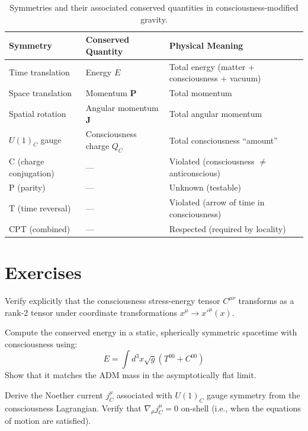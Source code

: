 \begin{table}[h]
\centering
\begin{tabular}{@{} p{} p{} p{} @{}}
\toprule
\textbf{Symmetry} & \textbf{Conserved Quantity} & \textbf{Physical Meaning} \\
\midrule
Time translation & Energy $E$ & Total energy (matter + consciousness + vacuum) \\
Space translation & Momentum $\mathbf{P}$ & Total momentum \\
Spatial rotation & Angular momentum $\mathbf{J}$ & Total angular momentum \\
$U(1)_C$ gauge & Consciousness charge $Q_C$ & Total consciousness ``amount'' \\
\midrule
C (charge conjugation) & --- & Violated (consciousness $\neq$ anticonscious) \\
P (parity) & --- & Unknown (testable) \\
T (time reversal) & --- & Violated (arrow of time in consciousness) \\
CPT (combined) & --- & Respected (required by locality) \\
\bottomrule
\end{tabular}
\caption{Symmetries and their associated conserved quantities in consciousness-modified gravity.}
\label{tab:symmetries-summary}
\end{table}

\section{Exercises}

\begin{exercise}
Verify explicitly that the consciousness stress-energy tensor $C^{\mu\nu}$ transforms as a rank-2 tensor under coordinate transformations $x^\mu \to x'^\mu(x)$.
\end{exercise}

\begin{exercise}
Compute the conserved energy in a static, spherically symmetric spacetime with consciousness using:
\begin{equation}
E = \int d^3x \sqrt{g} \left( T^{00} + C^{00} \right)
\end{equation}
Show that it matches the ADM mass in the asymptotically flat limit.
\end{exercise}

\begin{exercise}
Derive the Noether current $j^\mu_C$ associated with $U(1)_C$ gauge symmetry from the consciousness Lagrangian. Verify that $\nabla_\mu j^\mu_C = 0$ on-shell (i.e., when the equations of motion are satisfied).
\end{exercise}

